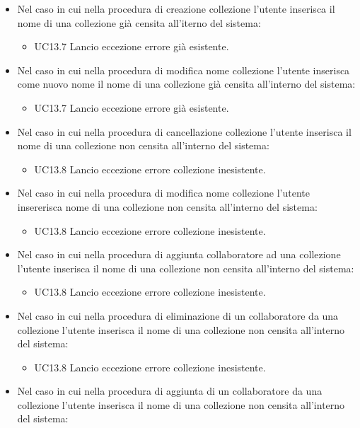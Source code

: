 \documentclass{scalatekids-article}
\begin{document}
\begin{itemize}
  \item Nel caso in cui nella procedura di creazione collezione l'utente inserisca il nome di una collezione già censita all'iterno del sistema:
  \begin{itemize}
    \item UC13.7 Lancio eccezione errore  già esistente.
  \end{itemize}
  \item Nel caso in cui nella procedura di modifica nome collezione l'utente inserisca come nuovo nome il nome di una collezione già censita all'interno del sistema:
  \begin{itemize}
    \item UC13.7 Lancio eccezione errore  già esistente.
  \end{itemize}
  \item Nel caso in cui nella procedura di cancellazione collezione l'utente inserisca il nome di una collezione non censita all'interno del sistema:
  \begin{itemize}
    \item UC13.8 Lancio eccezione errore collezione inesistente.
  \end{itemize}
  \item Nel caso in cui nella procedura di modifica nome collezione l'utente insererisca nome di una collezione non censita all'interno del sistema:
  \begin{itemize}
    \item UC13.8 Lancio eccezione errore collezione inesistente.
  \end{itemize}
  \item Nel caso in cui nella procedura di aggiunta collaboratore ad una  collezione l'utente inserisca il nome di una collezione non censita all'interno del sistema:
  \begin{itemize}
    \item UC13.8 Lancio eccezione errore collezione inesistente.
  \end{itemize}
  \item Nel caso in cui nella procedura di eliminazione di un collaboratore da una collezione l'utente inserisca il nome di una collezione non censita all'interno del sistema:
  \begin{itemize}
    \item UC13.8 Lancio eccezione errore collezione inesistente.
  \end{itemize}
  \item Nel caso in cui nella procedura di aggiunta di un collaboratore da una collezione l'utente inserisca il nome di una collezione non censita all'interno del sistema:

\end{itemize}
\end{document}
